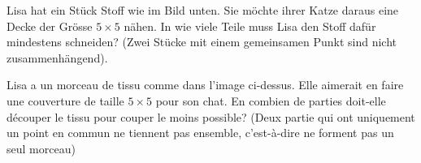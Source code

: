 Lisa hat ein Stück Stoff wie im Bild unten. Sie möchte ihrer Katze daraus eine Decke der Grösse $5 \times 5$ nähen. In wie viele Teile muss Lisa den Stoff dafür mindestens schneiden? (Zwei Stücke mit einem gemeinsamen Punkt sind nicht zusammenhängend).

\bigskip

Lisa a un morceau de tissu comme dans l'image ci-dessus. Elle aimerait en faire une couverture de taille $5 \times 5$ pour son chat. En combien de parties doit-elle découper le tissu pour couper le moins possible? (Deux partie qui ont uniquement un point en commun ne tiennent pas ensemble, c'est-à-dire ne forment pas un seul morceau)